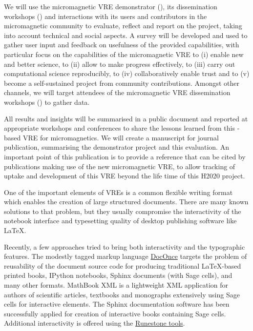 \begin{workpackage}
\begin{tasklist}
\begin{task}[title=Micromagnetic VRE dissemination workshops,
id=dissemination-of-oommf-nb-workshops,lead=XFEL,PM=6,partners={USO},wphases=18-44!0.46,issue=31]
  We will use the micromagnetic VRE demonstrator
  (), its dissemination
  workshops ()
  and interactions with its users and contributors in the
  micromagnetic community to evaluate, reflect and report on the
  project, taking into account technical and social aspects. A survey
  will be developed and used to gather user input and feedback on
  usefulness of the provided capabilities, with particular focus on
  the capabilities of the micromagnetic VRE to (i) enable new and
  better science, to (ii) allow to make progress effectively, to (iii)
  carry out computational science reproducibly, to (iv)
  collaboratively enable trust and to (v) become a self-sustained
  project from community contributions. Amongst other channels, we
  will target attendees of the micromagnetic VRE dissemination
  workshops () to
  gather data.

  All results and insights will be summarised in a public document and
  reported at appropriate workshops and conferences to share the
  lessons learned from this \Jupyter-based VRE for micromagnetics. We
  will create a manuscript for journal publication, summarising the
  demonstrator project and this evaluation. An important point of this
  publication is to provide a reference that can be cited by
  publications making use of the new micromagnetic VRE, to allow
  tracking of uptake and development of this VRE beyond the life time
  of this H2020 project.
\end{task}

\begin{task}[title=Demonstrator: Interactive books,
id=ibook,lead=US,partners={USO,XFEL},PM=42,wphases={0-46,40-46},issue=32]
One of the important elements of VREs is a common flexible writing format which
enables the creation of large structured documents. There are many
known solutions to that problem, but they usually compromise the
interactivity of the notebook interface and typesetting quality of desktop
publishing software like LaTeX.

Recently, a few approaches tried to bring both interactivity and the
typographic features. The modestly tagged markup language
\href{http://hplgit.github.io/doconce/doc/web/}{DocOnce}
targets the problem of reusability of the document source code for
producing traditional LaTeX-based printed books, IPython notebooks, Sphinx
documents (with Sage cells), and many other formats. MathBook XML
is a lightweight XML application for authors of scientific articles,
textbooks and monographs extensively using Sage cells for
interactive elements. The Sphinx documentation software has been
successfully applied for creation of interactive books containing Sage
cells. Additional interactivity is offered using the \href{http://runestoneinteractive.org}{Runestone tools}.


\end{task}
\end{tasklist}
\end{workpackage}
